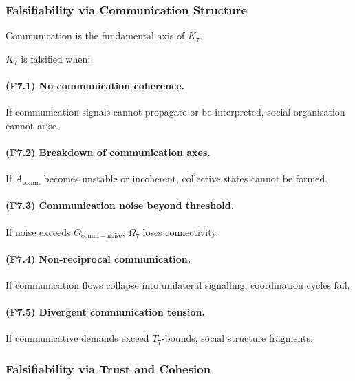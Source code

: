 \subsubsection{Falsifiability via Communication Structure}

Communication is the fundamental axis of $K_7$.

$K_7$ is falsified when:

\paragraph{(F7.1) No communication coherence.}
If communication signals cannot propagate or be interpreted,
social organisation cannot arise.

\paragraph{(F7.2) Breakdown of communication axes.}
If $A_{\mathrm{comm}}$ becomes unstable or incoherent,
collective states cannot be formed.

\paragraph{(F7.3) Communication noise beyond threshold.}
If noise exceeds $\Theta_{\mathrm{comm-noise}}$,
$\Omega_7$ loses connectivity.

\paragraph{(F7.4) Non-reciprocal communication.}
If communication flows collapse into unilateral signalling,
coordination cycles fail.

\paragraph{(F7.5) Divergent communication tension.}
If communicative demands exceed $T_7$-bounds,
social structure fragments.



\subsubsection{Falsifiability via Trust and Cohesion}

